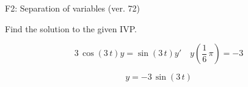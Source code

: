 \begin{exercise}
  \begin{exerciseTitle}F2: Separation of variables (ver. 72)\end{exerciseTitle}
  \begin{exerciseStatement}
    
Find the solution to the given IVP.

    
\[3 \, \cos\left(3 \, t\right) y= \sin\left(3 \, t\right) y'\hspace{1em} y\left( \frac{1}{6} \, \pi \right)= -3\]

  \end{exerciseStatement}
  \begin{exerciseAnswer}
    
\[y= -3 \, \sin\left(3 \, t\right)\]

  \end{exerciseAnswer}
\end{exercise}